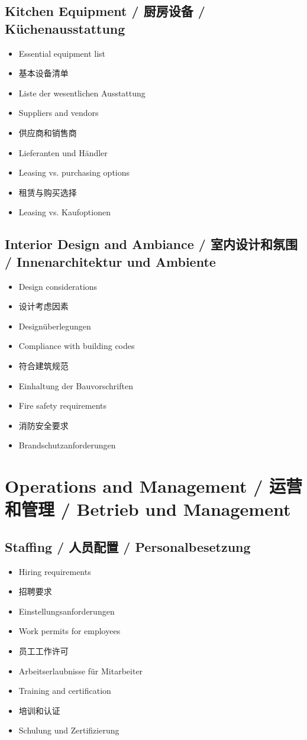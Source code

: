 \subsection{Kitchen Equipment / 厨房设备 / Küchenausstattung}
\begin{itemize}
    \item Essential equipment list
    \item 基本设备清单
    \item Liste der wesentlichen Ausstattung
    \item Suppliers and vendors
    \item 供应商和销售商
    \item Lieferanten und Händler
    \item Leasing vs. purchasing options
    \item 租赁与购买选择
    \item Leasing vs. Kaufoptionen
\end{itemize}

\subsection{Interior Design and Ambiance / 室内设计和氛围 / Innenarchitektur und Ambiente}
\begin{itemize}
    \item Design considerations
    \item 设计考虑因素
    \item Designüberlegungen
    \item Compliance with building codes
    \item 符合建筑规范
    \item Einhaltung der Bauvorschriften
    \item Fire safety requirements
    \item 消防安全要求
    \item Brandschutzanforderungen
\end{itemize}

\section{Operations and Management / 运营和管理 / Betrieb und Management}

\subsection{Staffing / 人员配置 / Personalbesetzung}
\begin{itemize}
    \item Hiring requirements
    \item 招聘要求
    \item Einstellungsanforderungen
    \item Work permits for employees
    \item 员工工作许可
    \item Arbeitserlaubnisse für Mitarbeiter
    \item Training and certification
    \item 培训和认证
    \item Schulung und Zertifizierung
\end{itemize}

